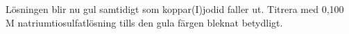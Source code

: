 \documentclass[./chem_exercises.tex]{subfiles}
\begin{document}
Lösningen blir nu gul samtidigt som koppar(I)jodid
faller ut.\leavevmode{}
Titrera med 0,100 M natriumtiosulfatlösning tills den gula färgen bleknat betydligt.
\begin{figure}[H]
\caption{}
\end{figure}
\end{document}
